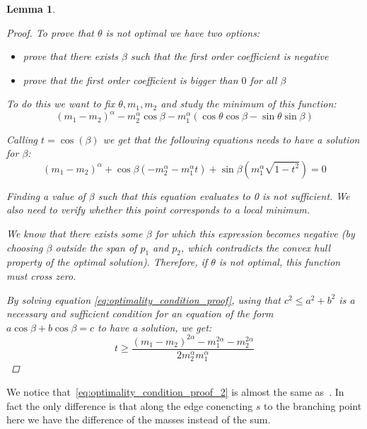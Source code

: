 \documentclass[11pt,reqno,a4paper]{amsart}
\numberwithin{equation}{section}
\theoremstyle{mytheorem}
\newtheorem{lemma}[subsection]{Lemma}
\theoremstyle{myremark}
\theoremstyle{myparagraph}
\begin{document}
\begin{lemma}
\begin{proof}
            To prove that $\theta$ is not optimal we have two options:
            \begin{itemize}
                \item prove that there exists $\beta$ such that the first order coefficient is negative
                \item prove that the first order coefficient is bigger than $0$ for all $\beta$
            \end{itemize}


            To do this we want to fix $\theta, m_1, m_2$ and study the minimum of this function:
            \begin{equation}
            (m_1-m_2)
                ^\alpha - m_2^\alpha \cos\beta - m_1^\alpha (\cos\theta\cos\beta - \sin\theta\sin\beta)
            \end{equation}

            Calling $t = \cos(\beta)$ we get that the following equations needs to have a solution for $\beta$:
            \begin{equation}
                \label{eq:optimality_condition_proof}
                (m_1-m_2)
                ^{\alpha} + \cos\beta(-m_2^\alpha-m_1^\alpha t) + \sin\beta(m_1^\alpha \sqrt{1-t^2}) = 0
            \end{equation}

            Finding a value of $\beta$ such that this equation evaluates to 0 is not sufficient.
            We also need to verify whether this point corresponds to a local minimum.

            We know that there exists some $\beta$ for which this expression becomes negative (by choosing $\beta$ outside the
            span of $p_1$ and $p_2$, which contradicts the convex hull property of the optimal solution). Therefore, if $\theta$
            is not optimal, this function must cross zero.


            By solving equation \ref{eq:optimality_condition_proof}, using that $c^2 \le a^2 + b^2$ is a necessary and
            sufficient condition for an equation of the form $a\cos\beta + b\cos\beta = c$ to have a solution, we get:
            \begin{equation}
                \label{eq:optimality_condition_proof_2}
                t \ge \frac{(m_1-m_2)^{2\alpha} - m_1^{2\alpha} - m_2^{2\alpha}}{2m_2^\alpha m_1^\alpha}
            \end{equation}
        \end{proof}

    \end{lemma}
    We notice that~\ref{eq:optimality_condition_proof_2} is almost the same as~\cite[lemma 12.2]{Bernot}.
    In fact the only difference is that along the edge conencting $s$ to the branching point here we have the difference
    of the masses instead of the sum.
\end{document}
